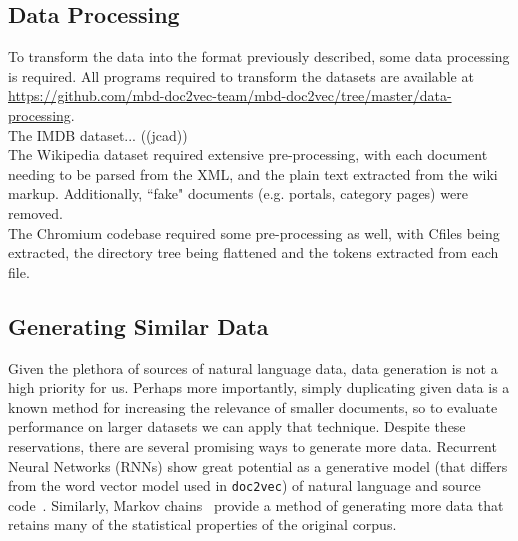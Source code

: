 \documentclass[11pt]{article}
\newcommand{\CPP}
{C\nolinebreak[4]\hspace{-.05em}\raisebox{.22ex}{\footnotesize\bf ++\ }}
\begin{document}
\subsection*{Data Processing}
  To transform the data into the format previously described, some data processing
  is required. All programs required to transform the datasets are available at
  \url{https://github.com/mbd-doc2vec-team/mbd-doc2vec/tree/master/data-processing}.\\
  The IMDB dataset... ((jcad))\\
  The Wikipedia dataset required extensive pre-processing, with each document
  needing to be parsed from the XML, and the plain text extracted from the wiki markup.
  Additionally, ``fake" documents (e.g. portals, category pages) were removed.\\
  The Chromium codebase required some pre-processing as well, with \CPP files being
  extracted, the directory tree being flattened and the tokens extracted from each file.
\subsection*{Generating Similar Data}
  Given the plethora of sources of natural language data, data generation is not a high
  priority for us. Perhaps more importantly, simply duplicating given data is a known
  method for increasing the relevance of smaller documents, so to evaluate performance
  on larger datasets we can apply that technique. Despite these reservations, there are
  several promising ways to generate more data. Recurrent Neural Networks (RNNs) show
  great potential as a generative model (that differs from the word vector model used
  in \texttt{doc2vec}) of natural language and source code~\cite{rnn2015}. Similarly,
  Markov chains~\cite{shannon2001mathematical} provide a method of generating more data
  that retains many of the statistical properties of the original corpus.

\newpage
\printbibliography
\end{document}
